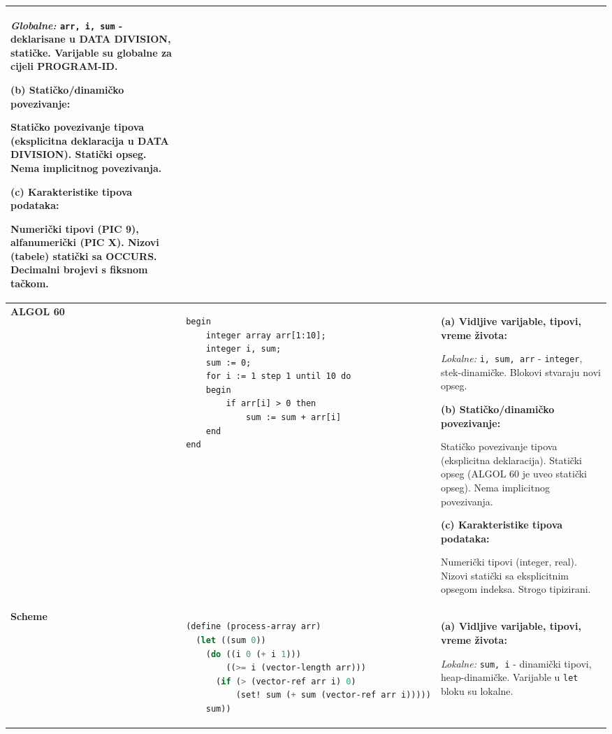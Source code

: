 \documentclass[12pt,a4paper]{article}
\begin{document}
\begin{longtable}{|p{2cm}|p{5cm}|p{8cm}|}
\textit{Globalne:} \texttt{arr, i, sum} - deklarisane u DATA DIVISION, statičke. Varijable su globalne za cijeli PROGRAM-ID.

\vspace{0.2cm}
\textbf{(b) Statičko/dinamičko povezivanje:}

Statičko povezivanje tipova (eksplicitna deklaracija u DATA DIVISION). Statički opseg. Nema implicitnog povezivanja.

\vspace{0.2cm}
\textbf{(c) Karakteristike tipova podataka:}

Numerički tipovi (PIC 9), alfanumerički (PIC X). Nizovi (tabele) statički sa OCCURS. Decimalni brojevi s fiksnom tačkom. \\
\hline

\textbf{ALGOL 60} & 
\begin{lstlisting}[language=Algol]
begin
    integer array arr[1:10];
    integer i, sum;
    sum := 0;
    for i := 1 step 1 until 10 do
    begin
        if arr[i] > 0 then
            sum := sum + arr[i]
    end
end
\end{lstlisting} & 
\textbf{(a) Vidljive varijable, tipovi, vreme života:}

\textit{Lokalne:} \texttt{i, sum, arr} - \texttt{integer}, stek-dinamičke. Blokovi stvaraju novi opseg.

\vspace{0.2cm}
\textbf{(b) Statičko/dinamičko povezivanje:}

Statičko povezivanje tipova (eksplicitna deklaracija). Statički opseg (ALGOL 60 je uveo statički opseg). Nema implicitnog povezivanja.

\vspace{0.2cm}
\textbf{(c) Karakteristike tipova podataka:}

Numerički tipovi (integer, real). Nizovi statički sa eksplicitnim opsegom indeksa. Strogo tipizirani. \\
\hline

\textbf{Scheme} & 
\begin{lstlisting}[language=Lisp]
(define (process-array arr)
  (let ((sum 0))
    (do ((i 0 (+ i 1)))
        ((>= i (vector-length arr)))
      (if (> (vector-ref arr i) 0)
          (set! sum (+ sum (vector-ref arr i)))))
    sum))
\end{lstlisting} & 
\textbf{(a) Vidljive varijable, tipovi, vreme života:}

\textit{Lokalne:} \texttt{sum, i} - dinamički tipovi, heap-dinamičke. Varijable u \texttt{let} bloku su lokalne.


\end{longtable}
\end{document}
